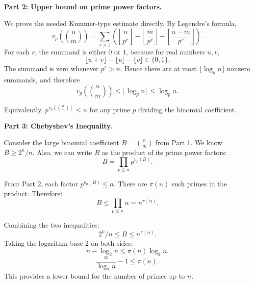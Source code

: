 \begin{solution}
\textbf{Part 2: Upper bound on prime power factors.}

We prove the needed Kummer-type estimate directly. By Legendre's formula,
\[
v_p\left(\binom{n}{m}\right)
=\sum_{r\geq 1}\left(
\left\lfloor\frac{n}{p^r}\right\rfloor
-\left\lfloor\frac{m}{p^r}\right\rfloor
-\left\lfloor\frac{n-m}{p^r}\right\rfloor
\right).
\]
For each $r$, the summand is either $0$ or $1$, because for real numbers $u,v$,
\[
\lfloor u+v\rfloor-\lfloor u\rfloor-\lfloor v\rfloor\in\{0,1\}.
\]
The summand is zero whenever $p^r>n$. Hence there are at most $\lfloor \log_p n\rfloor$ nonzero summands, and therefore
\[
v_p\left(\binom{n}{m}\right) \leq \lfloor \log_p n\rfloor \leq \log_p n.
\]

\bigskip

Equivalently, $p^{v_p(\binom{n}{m})} \leq n$ for any prime $p$ dividing the binomial coefficient.

\bigskip

\textbf{Part 3: Chebyshev's Inequality.}

Consider the large binomial coefficient $B = \binom{n}{m}$ from Part 1. We know $B \geq 2^n/n$.
Also, we can write $B$ as the product of its prime power factors:
\[ B = \prod_{p \leq n} p^{v_p(B)}. \]

\bigskip

From Part 2, each factor $p^{v_p(B)} \leq n$. There are $\pi(n)$ such primes in the product. Therefore:
\[ B \leq \prod_{p \leq n} n = n^{\pi(n)}. \]

\bigskip

Combining the two inequalities:
\[ 2^n/n \leq B \leq n^{\pi(n)}. \]
Taking the logarithm base 2 on both sides:
\[ n - \log_2 n \leq \pi(n) \log_2 n. \]
\[ \frac{n}{\log_2 n} - 1 \leq \pi(n). \]
This provides a lower bound for the number of primes up to $n$.
\end{solution}

